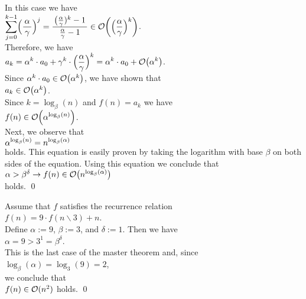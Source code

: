 \begin{enumerate}
      In this case we have
      \\[0.2cm]
      \hspace*{1.3cm}
      $\ds\sum\limits_{j=0}^{k-1} \Bigl(\frac{\,\alpha\,}{\gamma}\Bigr)^j = \bruch{\bigl(\frac{\alpha}{\gamma})^k - 1}{\frac{\alpha}{\gamma} - 1} \in \Oh\biggl(\Bigl(\frac{\alpha}{\gamma}\Bigr)^k\biggr)$.
      \\[0.2cm]
      Therefore, we have
      \\[0.2cm]
      \hspace*{1.3cm}
      $\displaystyle a_k = \alpha^k\cdot a_0 + \gamma^k \cdot \Bigl(\frac{\alpha}{\gamma}\Bigr)^k = \alpha^k\cdot a_0 + \mathcal{O}\bigl(\alpha^k\bigr)$.
      \\[0.2cm] 
      Since $\alpha^k \cdot a_0 \in \mathcal{O}\bigl(\alpha^k\bigr)$, we have shown that
      \\[0.2cm]
      \hspace*{1.3cm}
      $a_k \in  \mathcal{O}\bigl(\alpha^k\bigr)$.
      \\[0.2cm]
      Since  $k = \log_{\beta}(n)$ and $f(n) = a_k$ we have
      \\[0.2cm]
      \hspace*{1.3cm}
      $f(n) \in \mathcal{O}\Bigl(\alpha^{\log_{\beta}(n)}\Bigr)$.
      \\[0.2cm] 
      Next, we observe that 
      \\[0.2cm]
      \hspace*{1.3cm}
      $\displaystyle\alpha^{\log_{\beta}(n)} = n^{\log_{\beta}(\alpha)}$
      \\[0.2cm]
      holds.   This equation is easily proven by taking the logarithm with base $\beta$ on both sides
      of the equation.  Using this equation we conclude that
      \\[0.2cm]
      \hspace*{1.3cm}
      $\alpha > \beta^\delta \rightarrow f(n) \in \mathcal{O}\bigl(n^{\log_{\beta}(\alpha)}\bigr)$
      \\[0.2cm]
      holds.  \qed
\end{enumerate}


\example
Assume that $f$ satisfies the recurrence relation
\\[0.2cm]
\hspace*{1.3cm}
$f(n) = 9 \cdot f(n \backslash 3) + n$.
\\[0.2cm] 
Define $\alpha := 9$, $\beta := 3$, and $\delta := 1$.
Then we have
\\[0.2cm]
\hspace*{1.3cm}
$\alpha = 9 > 3^1 = \beta^\delta$.
\\[0.2cm] 
This is the last case of the master theorem and, since 
\\[0.2cm]
\hspace*{1.3cm}
$\log_{\beta}(\alpha) = \log_3(9) = 2$,
\\[0.2cm]
we conclude that
\\[0.2cm]
\hspace*{1.3cm}
$f(n) \in \mathcal{O}(n^2)$ \quad holds.
 \qed


